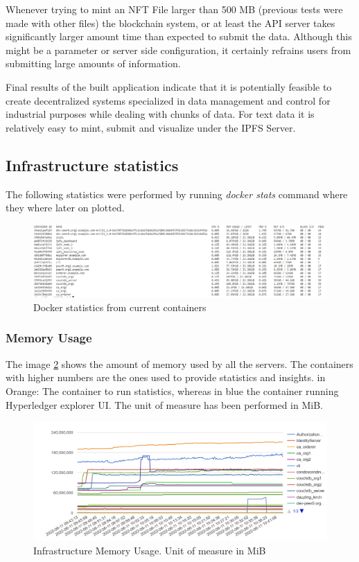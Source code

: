Whenever trying to mint an NFT File larger than 500 MB (previous tests were made with other files) the blockchain system, or at least the \ac{API} server takes significantly larger amount time than expected to submit the data. Although this might be a parameter or server side configuration, it certainly refrains users from submitting large amounts of information.

Final results of the built application indicate that it is potentially feasible to create decentralized systems specialized in data management and control for industrial purposes while dealing with chunks of data. For text data it is relatively easy to mint, submit and visualize under the IPFS Server.

\subsection{Infrastructure statistics}
The following statistics were performed by running \textit{docker stats} command where they where later on plotted.
\begin{figure}[h!]
        \centering
        \includegraphics[width=15cm]{img/Docker_Stats.png}
        \caption{Docker statistics from current containers}
        \label{fig:dockerStats}
\end{figure}

\subsubsection{Memory Usage}
The image \ref{fig:dockerMem} shows the amount of memory used by all the servers. The containers with higher numbers are the ones used to provide statistics and insights. in Orange: The container to run statistics, whereas in blue the container running Hyperledger explorer \ac{UI}. The unit of measure has been performed in \ac{MiB}.
\begin{figure}[h!]
        \centering
        \includegraphics[width=15cm]{img/Docker_Mem.png}
        \caption{Infrastructure Memory Usage. Unit of measure in MiB}
        \label{fig:dockerMem}
\end{figure}

